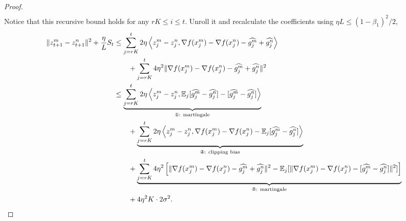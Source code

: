 \documentclass{article} %
\numberwithin{equation}{section}
\newcommand{\cirone}{\text{\ding{172}}}
\newcommand{\cirtwo}{\text{\ding{173}}}
\newcommand{\cirthree}{\text{\ding{174}}}
\begin{document}
\begin{proof}
\begin{equation}
\begin{aligned}
        \end{aligned}
    \end{equation}
    Notice that this recursive bound holds for any $rK\leq i\leq t$. Unroll it and recalculate the coefficients using $\eta L\leq (1-\beta_1)^2/2$,
    \begin{equation}
        \begin{aligned}
            \|z_{t+1}^m-z_{t+1}^n\|^2+\frac{\eta}{L}S_t
            &\leq \sum_{j=rK}^t 2\eta\left\langle z_j^m-z_j^n,\nabla f(x_j^m)-\nabla f(x_j^n)-\widehat{g_j^m} + \widehat{g_j^n}\right\rangle \\
            &\qquad + \sum_{j=rK}^t 4\eta^2\|\nabla f(x_j^m)-\nabla f(x_j^n)-\widehat{g_j^m}+\widehat{g_j^n}\|^2 \\
            &\leq \underbrace{\sum_{j=rK}^t 2\eta\left\langle z_j^m-z_j^n,\expect_j[\widehat{g_j^m} - \widehat{g_j^n}] - [\widehat{g_j^m} - \widehat{g_j^n}] \right\rangle}_{\cirone\text{: martingale}} \\
            &\qquad +\underbrace{\sum_{j=rK}^t 2\eta\left\langle z_j^m-z_j^n,\nabla f(x_j^m)-\nabla f(x_j^n)-\expect_j[\widehat{g_j^m} - \widehat{g_j^n}] \right\rangle}_{\cirtwo\text{: clipping bias}} \\
            &\qquad + \underbrace{\sum_{j=rK}^t 4\eta^2\left[\|\nabla f(x_j^m)-\nabla f(x_j^n)-\widehat{g_j^m} + \widehat{g_j^n}\|^2-\expect_j[\|\nabla f(x_j^m)-\nabla f(x_j^n)-[\widehat{g_j^m} - \widehat{g_j^n}]\|^2]\right]}_{\cirthree\text{: martingale}} \\
            &\qquad + 4\eta^2K\cdot 2\sigma^2.
        \end{aligned}
    \end{equation}
    

\end{proof}
\end{document}
